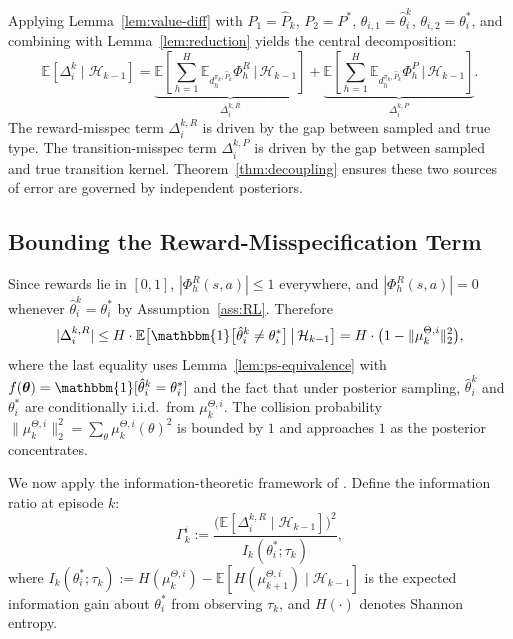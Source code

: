 \documentclass{article}
\begin{document}
Applying Lemma~\ref{lem:value-diff} with $P_1 = \hat{P}_k$, $P_2 = P^*$, $\theta_{i,1} = \hat{\theta}_i^k$, $\theta_{i,2} = \theta_i^*$, and combining with Lemma~\ref{lem:reduction} yields the central decomposition:
\begin{equation}
\label{eq:central-decomp}
\mathbb{E}[\Delta_i^k \mid \mathcal{H}_{k-1}] = \underbrace{\mathbb{E}\left[\sum_{h=1}^H \mathbb{E}_{d_h^{\pi_k, \hat{P}_k}}\Phi_h^R \,\Big|\, \mathcal{H}_{k-1}\right]}_{\Delta_i^{k,R}} + \underbrace{\mathbb{E}\left[\sum_{h=1}^H \mathbb{E}_{d_h^{\pi_k, \hat{P}_k}}\Phi_h^P \,\Big|\, \mathcal{H}_{k-1}\right]}_{\Delta_i^{k,P}}.
\end{equation}
The reward-misspec term $\Delta_i^{k,R}$ is driven by the gap between sampled and true type. The transition-misspec term $\Delta_i^{k,P}$ is driven by the gap between sampled and true transition kernel. Theorem~\ref{thm:decoupling} ensures these two sources of error are governed by independent posteriors.

\subsection{Bounding the Reward-Misspecification Term}

Since rewards lie in $[0, 1]$, $|\Phi_h^R(s, a)| \leq 1$ everywhere, and $|\Phi_h^R(s, a)| = 0$ whenever $\hat{\theta}_i^k = \theta_i^*$ by Assumption~\ref{ass:RL}. Therefore
\begin{equation}
|\Delta_i^{k,R}| \leq H \cdot \mathbb{E}\big[\mathbbm{1}\big[\hat{\theta}_i^k \neq \theta_i^*\big] \,\big|\, \mathcal{H}_{k-1}\big] = H \cdot \big(1 - \|\mu_k^{\Theta,i}\|_2^2\big),
\end{equation}
where the last equality uses Lemma~\ref{lem:ps-equivalence} with $f(\boldsymbol{\theta}) = \mathbbm{1}[\hat{\theta}_i^k = \theta_i^*]$ and the fact that under posterior sampling, $\hat{\theta}_i^k$ and $\theta_i^*$ are conditionally i.i.d.\ from $\mu_k^{\Theta,i}$. The collision probability $\|\mu_k^{\Theta,i}\|_2^2 = \sum_\theta \mu_k^{\Theta,i}(\theta)^2$ is bounded by $1$ and approaches $1$ as the posterior concentrates.

We now apply the information-theoretic framework of \citet{russo2016information}. Define the information ratio at episode $k$:
\begin{equation}
\Gamma_k^i := \frac{\big(\mathbb{E}[\Delta_i^{k,R} \mid \mathcal{H}_{k-1}]\big)^2}{I_k(\theta_i^*; \tau_k)},
\end{equation}
where $I_k(\theta_i^*; \tau_k) := H(\mu_k^{\Theta,i}) - \mathbb{E}[H(\mu_{k+1}^{\Theta,i}) \mid \mathcal{H}_{k-1}]$ is the expected information gain about $\theta_i^*$ from observing $\tau_k$, and $H(\cdot)$ denotes Shannon entropy.
\end{document}

